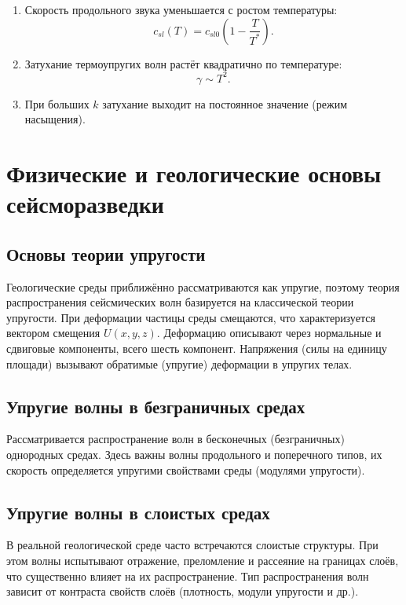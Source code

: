 \begin{enumerate}
    \item Скорость продольного звука уменьшается с ростом температуры:  
    \[
    c_{sl}(T) = c_{sl0}\left(1 - \frac{T}{T^*}\right).
    \]
    \item Затухание термоупругих волн растёт квадратично по температуре:
    \[
    \gamma \sim T^2.
    \]
    \item При больших $k$ затухание выходит на постоянное значение (режим насыщения).
\end{enumerate}



\section*{Физические и геологические основы сейсморазведки}

\subsection*{Основы теории упругости}  
Геологические среды приближённо рассматриваются как упругие, поэтому теория распространения сейсмических волн базируется на классической теории упругости. При деформации частицы среды смещаются, что характеризуется вектором смещения \(U(x,y,z)\). Деформацию описывают через нормальные и сдвиговые компоненты, всего шесть компонент. Напряжения (силы на единицу площади) вызывают обратимые (упругие) деформации в упругих телах.

\subsection*{Упругие волны в безграничных средах}  
Рассматривается распространение волн в бесконечных (безграничных) однородных средах. Здесь важны волны продольного и поперечного типов, их скорость определяется упругими свойствами среды (модулями упругости).

\subsection*{Упругие волны в слоистых средах}  
В реальной геологической среде часто встречаются слоистые структуры. При этом волны испытывают отражение, преломление и рассеяние на границах слоёв, что существенно влияет на их распространение. Тип распространения волн зависит от контраста свойств слоёв (плотность, модули упругости и др.).

